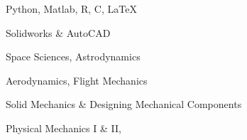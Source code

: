 \documentclass[11pt]{spidercv}
\begin{document}
    \begin{SideBar}{\ColorBackground}{\ColorTextSide}
        
        
        
        \vspace*{0.5cm}
         \begin{ItemList}{\ColorHighlight}
         \item [\faCodeFork]  Python, Matlab, R, C, LaTeX
            \item [\faCubes]  Solidworks \& AutoCAD  
        \end{ItemList}
        \vspace*{0.5cm}
        


        \begin{ItemList}{\ColorHighlight}
            \item [\faSpaceShuttle] Space Sciences, Astrodynamics
            \item [\faPlane]  Aerodynamics, Flight Mechanics
            \item [\faCubes]  Solid Mechanics \& Designing Mechanical Components
            \item [\faBook]  Physical Mechanics I \& II,
        \end{ItemList}



        \begin{SpiderDiagram}{\ColorTextSide}{\ColorHighlight}
        \end{SpiderDiagram}

        \vspace*{1cm}


        \begin{SkillGauges}{\ColorHighlight}
        \end{SkillGauges}
    \end{SideBar}
\end{document}
